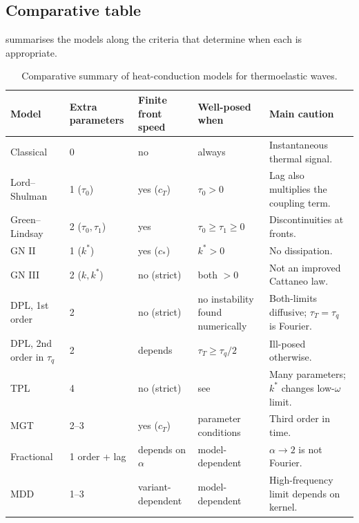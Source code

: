 \subsection{Comparative table}
 summarises the models along the criteria that determine when each is appropriate.
\begin{table}[ht]\centering\small
\caption{Comparative summary of heat-conduction models for thermoelastic waves.}\label{tab:final}
\begin{tabularx}{\textwidth}{@{}p{2.3cm}p{1.5cm}p{1.9cm}p{2.3cm}X@{}}\toprule
Model & Extra parameters & Finite front speed & Well-posed when & Main caution\\\midrule
Classical & 0 & no & always & Instantaneous thermal signal.\\
Lord--Shulman & 1 ($\tau_0$) & yes ($c_T$) & $\tau_0>0$ & Lag also multiplies the coupling term.\\
Green--Lindsay & 2 ($\tau_0,\tau_1$) & yes & $\tau_0\ge\tau_1\ge0$ & Discontinuities at fronts.\\
GN II & 1 ($k^*$) & yes ($c_*$) & $k^*>0$ & No dissipation.\\
GN III & 2 ($k,k^*$) & no (strict) & both $>0$ & Not an improved Cattaneo law.\\
DPL, 1st order & 2 & no (strict) & no instability found numerically & Both-limits diffusive; $\tau_T=\tau_q$ is Fourier.\\
DPL, 2nd order in $\tau_q$ & 2 & depends & $\tau_T\ge\tau_q/2$ & Ill-posed otherwise.\\
TPL & 4 & no (strict) & see \citep{Chirita2016} & Many parameters; $k^*$ changes low-$\omega$ limit.\\
MGT & 2--3 & yes ($c_T$) & parameter conditions & Third order in time.\\
Fractional & 1 order + lag & depends on $\alpha$ & model-dependent & $\alpha\to2$ is not Fourier.\\
MDD & 1--3 & variant-dependent & model-dependent & High-frequency limit depends on kernel.\\\bottomrule
\end{tabularx}
\end{table}

